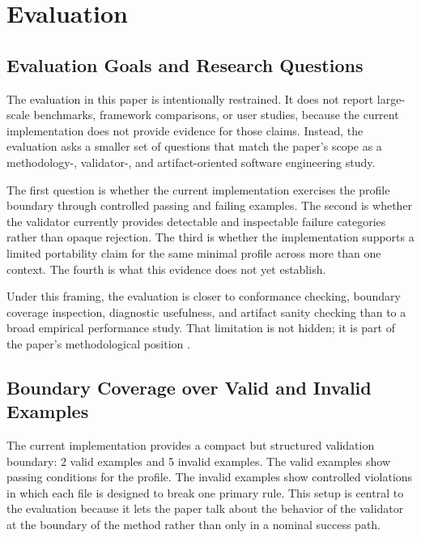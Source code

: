\section{Evaluation}

\subsection{Evaluation Goals and Research Questions}

The evaluation in this paper is intentionally restrained. It does not report large-scale benchmarks, framework comparisons, or user studies, because the current implementation does not provide evidence for those claims. Instead, the evaluation asks a smaller set of questions that match the paper's scope as a methodology-, validator-, and artifact-oriented software engineering study.

The first question is whether the current implementation exercises the profile boundary through controlled passing and failing examples. The second is whether the validator currently provides detectable and inspectable failure categories rather than opaque rejection. The third is whether the implementation supports a limited portability claim for the same minimal profile across more than one context. The fourth is what this evidence does not yet establish.

Under this framing, the evaluation is closer to conformance checking, boundary coverage inspection, diagnostic usefulness, and artifact sanity checking than to a broad empirical performance study. That limitation is not hidden; it is part of the paper's methodological position \cite{knublauch2017shacl,wright2022jsonschemavalidation}.

\subsection{Boundary Coverage over Valid and Invalid Examples}

The current implementation provides a compact but structured validation boundary: 2 valid examples and 5 invalid examples. The valid examples show passing conditions for the profile. The invalid examples show controlled violations in which each file is designed to break one primary rule. This setup is central to the evaluation because it lets the paper talk about the behavior of the validator at the boundary of the method rather than only in a nominal success path.



